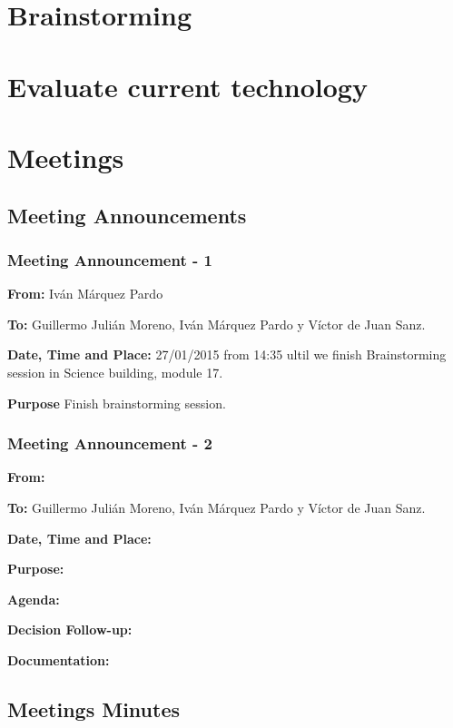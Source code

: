 \documentclass{report}
\begin{document}
\chapter{Brainstorming}




\chapter{Evaluate current technology}
\newpage

\chapter{Meetings}


\section{Meeting Announcements}
\subsection{Meeting Announcement - 1}

\textbf{From: } Iván Márquez Pardo

\textbf{To: } Guillermo Julián Moreno, Iván Márquez Pardo y Víctor de Juan Sanz.

\textbf{Date, Time and Place: } 27/01/2015 from 14:35 ultil we finish Brainstorming session in Science building, module 17.

\textbf{Purpose} Finish brainstorming session.

\subsection{Meeting Announcement - 2}


\textbf{From: }

\textbf{To: } Guillermo Julián Moreno, Iván Márquez Pardo y Víctor de Juan Sanz.


\textbf{Date, Time and Place: }


\textbf{Purpose: }


\textbf{Agenda: }

\textbf{Decision Follow-up: }


\textbf{Documentation: }


\section{Meetings Minutes}
\end{document}
